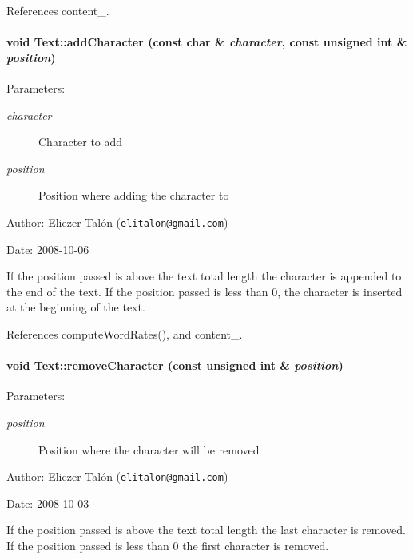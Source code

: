 References content\_\-.\hypertarget{class_text_fdd11ad0c90ca483d4cff3d74a64da9e}{
\paragraph[addCharacter]{\setlength{\rightskip}{0pt plus 5cm}void Text::addCharacter (const char \& {\em character}, \/  const unsigned int \& {\em position})}\hfill}
\label{class_text_fdd11ad0c90ca483d4cff3d74a64da9e}


\begin{Desc}
\item[Parameters:]
\begin{description}
\item[{\em character}]Character to add \item[{\em position}]Position where adding the character to\end{description}
\end{Desc}
\begin{Desc}
\item[Author:]Eliezer Talón (\href{mailto:elitalon@gmail.com}{\tt elitalon@gmail.com}) \end{Desc}
\begin{Desc}
\item[Date:]2008-10-06\end{Desc}
If the position passed is above the text total length the character is appended to the end of the text. If the position passed is less than 0, the character is inserted at the beginning of the text. 

References computeWordRates(), and content\_\-.\hypertarget{class_text_e04500eeada2a4a3bb00554b32263c52}{
\paragraph[removeCharacter]{\setlength{\rightskip}{0pt plus 5cm}void Text::removeCharacter (const unsigned int \& {\em position})}\hfill}
\label{class_text_e04500eeada2a4a3bb00554b32263c52}


\begin{Desc}
\item[Parameters:]
\begin{description}
\item[{\em position}]Position where the character will be removed\end{description}
\end{Desc}
\begin{Desc}
\item[Author:]Eliezer Talón (\href{mailto:elitalon@gmail.com}{\tt elitalon@gmail.com}) \end{Desc}
\begin{Desc}
\item[Date:]2008-10-03\end{Desc}
If the position passed is above the text total length the last character is removed. If the position passed is less than 0 the first character is removed. 

